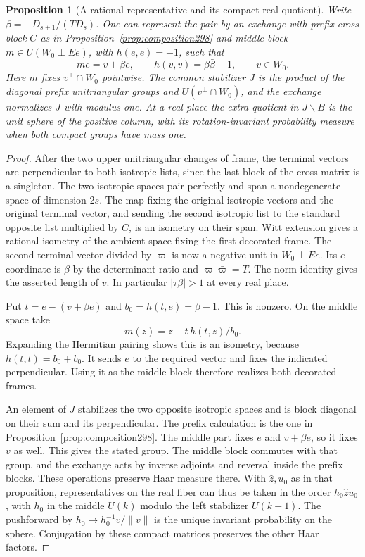 \documentclass[a4paper,11pt]{article}
\newtheorem{proposition}{Proposition}[section]
\theoremstyle{definition}
\theoremstyle{remark}
\numberwithin{equation}{section}
\begin{document}
\begin{proposition}[A rational representative and its compact real quotient]\leavevmode
\label{prop:middle299}
Write \(\beta=-D_{s+1}/(T D_s)\). One can represent the
pair by an exchange with prefix cross block \(C\) as in
Proposition~\ref{prop:composition298} and middle block
\(m\in U(W_0\perp Ee)\), with \(h(e,e)=-1\), such that
\[
             me=v+\beta e,\qquad h(v,v)=\beta\bar\beta-1,
                     \qquad v\in W_0 .
\]
Here \(m\) fixes \(v^\perp\cap W_0\) pointwise. The common
stabilizer \(J\) is the product of the diagonal prefix
unitriangular groups and \(U(v^\perp\cap W_0)\), and the
exchange normalizes \(J\) with modulus one. At a real place
the extra quotient in \(J\backslash B\) is the unit sphere
of the positive column, with its rotation-invariant probability
measure when both compact groups have mass one.
\end{proposition}
\begin{proof}
After the two upper unitriangular changes of frame, the
terminal vectors are perpendicular to both isotropic lists,
since the last block of the cross matrix is a singleton.
The two isotropic spaces pair perfectly and span a nondegenerate
space of dimension \(2s\). The map fixing the original
isotropic vectors and the original terminal vector, and
sending the second isotropic list to the standard opposite
list multiplied by \(C\), is an isometry on their span.
Witt extension gives a rational isometry of the ambient
space fixing the first decorated frame. The second terminal
vector divided by \(\varpi\) is now a negative unit in
\(W_0\perp Ee\). Its \(e\)-coordinate is \(\beta\) by
the determinant ratio and \(\varpi\bar\varpi=T\).
The norm identity gives the asserted length of \(v\).
In particular \(|\tau\beta|>1\) at every real place.

Put \(t=e-(v+\beta e)\) and \(b_0=h(t,e)=\bar\beta-1\).
This is nonzero. On the middle space take
\[
             m(z)=z-t\,h(t,z)/b_0 .
\]
Expanding the Hermitian pairing shows this is an isometry,
because \(h(t,t)=b_0+\bar b_0\). It sends \(e\) to the
required vector and fixes the indicated perpendicular.
Using it as the middle block therefore realizes both
decorated frames.

An element of \(J\) stabilizes the two opposite isotropic
spaces and is block diagonal on their sum and its perpendicular.
The prefix calculation is the one in
Proposition~\ref{prop:composition298}. The middle part
fixes \(e\) and \(v+\beta e\), so it fixes \(v\) as well.
This gives the stated group. The middle block commutes with
that group, and the exchange acts by inverse adjoints and
reversal inside the prefix blocks. These operations preserve
Haar measure there. With \(\widehat z,u_0\) as in that
proposition, representatives on the real fiber can thus be
taken in the order \(h_0\widehat z u_0\), with \(h_0\)
in the middle \(U(k)\) modulo the left stabilizer \(U(k-1)\).
The pushforward by \(h_0\mapsto h_0^{-1}v/\|v\|\) is the
unique invariant probability on the sphere. Conjugation
by these compact matrices preserves the other Haar factors.
\end{proof}
\end{document}
